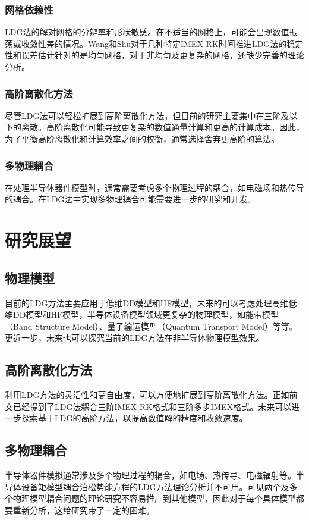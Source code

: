 \subsubsection{网格依赖性}
LDG法的解对网格的分辨率和形状敏感。在不适当的网格上，可能会出现数值振荡或收敛性差的情况。Wang和Shu对于几种特定IMEX RK时间推进LDG法的稳定性和误差估计针对的是均匀网格，对于非均匀及更复杂的网格，还缺少完善的理论分析。
\subsubsection{高阶离散化方法}
尽管LDG法可以轻松扩展到高阶离散化方法，但目前的研究主要集中在三阶及以下的离散。高阶离散化可能导致更复杂的数值通量计算和更高的计算成本。因此，为了平衡高阶离散化和计算效率之间的权衡，通常选择舍弃更高阶的算法。
\subsubsection{多物理耦合}
在处理半导体器件模型时，通常需要考虑多个物理过程的耦合，如电磁场和热传导的耦合。在LDG法中实现多物理耦合可能需要进一步的研究和开发。

\section{研究展望}
\subsection{物理模型}
目前的LDG方法主要应用于低维DD模型和HF模型，未来的可以考虑处理高维低维DD模型和HF模型，半导体设备模型领域更复杂的物理模型，如能带模型（Band Structure Model）、量子输运模型（Quantum Transport Model）等等。更近一步，未来也可以探究当前的LDG方法在非半导体物理模型效果。
\subsection{高阶离散化方法}
利用LDG方法的灵活性和高自由度，可以方便地扩展到高阶离散化方法。正如前文已经提到了LDG法耦合三阶IMEX RK格式和三阶多步IMEX格式\cite{wang2016stability}。未来可以进一步探索基于LDG的高阶方法，以提高数值解的精度和收敛速度。
\subsection{多物理耦合}
半导体器件模拟通常涉及多个物理过程的耦合，如电场、热传导、电磁辐射等。半导体设备矩模型耦合泊松势能方程的LDG方法理论分析并不可用\cite{liu2010error}。可见两个及多个物理模型耦合问题的理论研究不容易推广到其他模型，因此对于每个具体模型都要重新分析，这给研究带了一定的困难。
